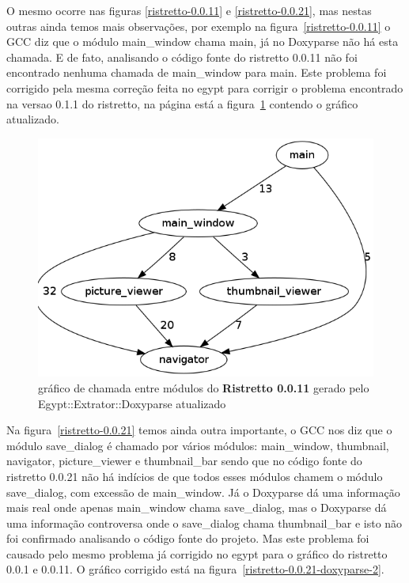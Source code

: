 O mesmo ocorre nas figuras \ref{ristretto-0.0.11} e \ref{ristretto-0.0.21}, mas
nestas outras ainda temos mais observações, por exemplo na
figura~\ref{ristretto-0.0.11} o GCC diz que o módulo main\_window chama main,
já no Doxyparse não há esta chamada. E de fato, analisando o código fonte do
ristretto 0.0.11 não foi encontrado nenhuma chamada de main\_window para main.
Este problema foi corrigido pela mesma correção feita no egypt para corrigir o
problema encontrado na versao 0.1.1 do ristretto, na página
\pageref{ristretto-0.0.11-doxyparse-2} está a
figura~\ref{ristretto-0.0.11-doxyparse-2} contendo o gráfico atualizado.

\begin{figure}
\center
\includegraphics[scale=0.5]{imagens/ristretto-0_0_11-doxyparse-2}
\caption{gráfico de chamada entre módulos do {\bf Ristretto 0.0.11} gerado pelo Egypt::Extrator::Doxyparse atualizado}
\label{ristretto-0.0.11-doxyparse-2}
\end{figure}

Na figura~\ref{ristretto-0.0.21} temos ainda outra importante, o GCC nos diz
que o módulo save\_dialog é chamado por vários módulos: main\_window,
thumbnail, navigator, picture\_viewer e thumbnail\_bar sendo que no código
fonte do ristretto 0.0.21 não há indícios de que todos esses módulos chamem o
módulo save\_dialog, com excessão de main\_window. Já o Doxyparse dá uma
informação mais real onde apenas main\_window chama save\_dialog, mas o
Doxyparse dá uma informação controversa onde o save\_dialog chama
thumbnail\_bar e isto não foi confirmado analisando o código fonte do projeto.
Mas este problema foi causado pelo mesmo problema já corrigido no egypt para o
gráfico do ristretto 0.0.1 e 0.0.11. O gráfico corrigido está na
figura~\ref{ristretto-0.0.21-doxyparse-2}.

